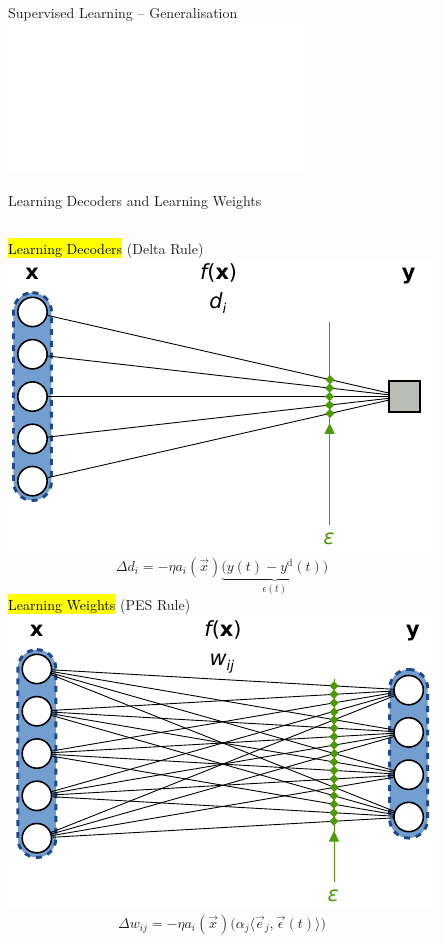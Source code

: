 \documentclass[handout,aspectratio=169]{beamer}
\begin{document}
	\begin{frame}{Supervised Learning -- Generalisation}
		\centering%
		\includegraphics<1>[width=\textwidth]{media/gradient_descent_poly_example_gt.pdf}%
	\end{frame}

	\begin{frame}{Learning Decoders and Learning Weights}
		\begin{columns}[T]
			\centering			
			\hl{Learning Decoders} (Delta Rule)\\[0.25cm]
			\includegraphics{media/pes_network_a.pdf}\\[-0.5cm]
			$$\Delta d_i = - \eta a_i(\vec x) \underbrace{\big(y(t) - y^\mathrm{d}(t)\big)}_{\epsilon(t)}$$
			\centering			
			\hl{Learning Weights} (PES Rule)\\[0.25cm]
			\includegraphics{media/pes_network_b.pdf}\\[-0.5cm]
			$$\Delta w_{ij} = - \eta a_i(\vec x) \Big(\alpha_j \langle \vec e_j, \vec \epsilon(t) \rangle \Big)$$
		\end{columns}
	\end{frame}
\end{document}
